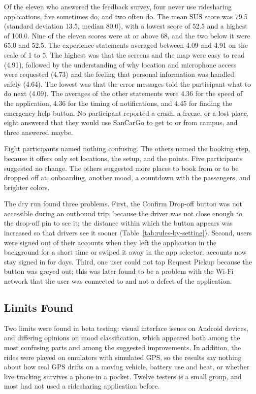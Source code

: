 Of the eleven who answered the feedback survey, four never use ridesharing applications, five sometimes do, and two often do. The mean SUS score was 79.5 (standard deviation 13.5, median 80.0), with a lowest score of 52.5 and a highest of 100.0. Nine of the eleven scores were at or above 68, and the two below it were 65.0 and 52.5. The experience statements averaged between 4.09 and 4.91 on the scale of 1 to 5. The highest was that the screens and the map were easy to read (4.91), followed by the understanding of why location and microphone access were requested (4.73) and the feeling that personal information was handled safely (4.64). The lowest was that the error messages told the participant what to do next (4.09). The averages of the other statements were 4.36 for the speed of the application, 4.36 for the timing of notifications, and 4.45 for finding the emergency help button. No participant reported a crash, a freeze, or a lost place, eight answered that they would use SanCarGo to get to or from campus, and three answered maybe.

Eight participants named nothing confusing. The others named the booking step, because it offers only set locations, the setup, and the points. Five participants suggested no change. The others suggested more places to book from or to be dropped off at, onboarding, another mood, a countdown with the passengers, and brighter colors.

The dry run found three problems. First, the Confirm Drop-off button was not accessible during an outbound trip, because the driver was not close enough to the drop-off pin to see it; the distance within which the button appears was increased so that drivers see it sooner (Table~\ref{tab:rules-by-setting}). Second, users were signed out of their accounts when they left the application in the background for a short time or swiped it away in the app selector; accounts now stay signed in for  days. Third, one user could not tap Request Pickup because the button was greyed out; this was later found to be a problem with the Wi-Fi network that the user was connected to and not a defect of the application.

\subsection{Limits Found}
Two limits were found in beta testing: visual interface issues on Android devices, and differing opinions on mood classification, which appeared both among the most confusing parts and among the suggested improvements. In addition, the rides were played on emulators with simulated GPS, so the results say nothing about how real GPS drifts on a moving vehicle, battery use and heat, or whether live tracking survives a phone in a pocket. Twelve testers is a small group, and most had not used a ridesharing application before.


